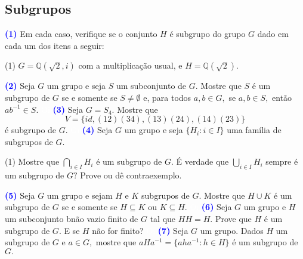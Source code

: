 \documentclass[12pt, a4paper]{article}
\newcommand{\negrito}[1]{\mbox{\boldmath{$#1$}}}
\begin{document}
\subsection{\textcolor{Floresta}{Subgrupos}}
\textcolor{blue}{\bf(1)}\label{9} Em cada caso, verifique se o conjunto $H$ é subgrupo do grupo $G$ dado em cada um dos itens a seguir:
\begin{tasks}[counter-format={(tsk[a])},label-width=3.6ex, label-format = {\bfseries}, column-sep = {0pt}](1)
\task[\textcolor{Floresta}{$\negrito{(a)} $}] $G = \mathbb{Q}(\sqrt{2}, i)$ com a multiplicação usual, e $H  = \mathbb{Q}(\sqrt{2}).$
\end{tasks}
\textcolor{blue}{\bf(2)}\label{10} Seja $G$ um grupo e seja $S$ um subconjunto de $G.$ Mostre que $S$ é um subgrupo de $G$ se e somente se $S \neq \emptyset$ e, para todos $a,b \in G,$ se $a,b \in S,$ então $ab^{-1} \in S.$
\textcolor{white}{Oi}\newline\newline
\textcolor{blue}{\bf(3)}\label{11} Seja $G = S_4.$ Mostre que 
\[
V = \{ id, (1 2)(3 4), (1 3)(2 4), (1 4)(2 3)\}
\]
é subgrupo de $G.$
\textcolor{white}{Oi}\newline\newline
\textcolor{blue}{\bf(4)}\label{12} Seja $G$ um grupo e seja $\{H_i : i \in I \}$ uma família de subgrupos de $G.$
\begin{tasks}[counter-format={(tsk[a])},label-width=3.6ex, label-format = {\bfseries}, column-sep = {0pt}](1)
\task[\textcolor{Floresta}{$\negrito{(a)} $}] Mostre que $\bigcap\limits_{i \in I} H_i$ é um subgrupo de $G.$
\task[\textcolor{Floresta}{$\negrito{(b)} $}] É verdade que $\bigcup\limits_{i \in I} H_i$ sempre é um subgrupo de $G?$ Prove ou dê contraexemplo.
\end{tasks}
\textcolor{blue}{\bf(5)}\label{13} Seja $G$ um grupo e sejam $H$ e $K$ subgrupos de $G.$ Mostre que $H \cup K$ é um subgrupo de $G$ se e somente se $H \subseteq K$ ou $K \subseteq H.$
\textcolor{white}{Oi}\newline\newline
\textcolor{blue}{\bf(6)}\label{14} Seja $G$ um grupo e $H$ um  subconjunto bnão vazio finito de $G$ tal que $HH = H.$ Prove que $H$ é um subgrupo de $G$. E se $H$ não for finito?
\textcolor{white}{Oi}\newline\newline
\textcolor{blue}{\bf(7)}\label{15} Seja $G$ um grupo. Dados $H$ um subgrupo de $G$ e $a \in G,$ mostre que $aHa^{-1} = \{aha^{ -1} : h \in H \}$ é um subgrupo de $G.$
\end{document}
